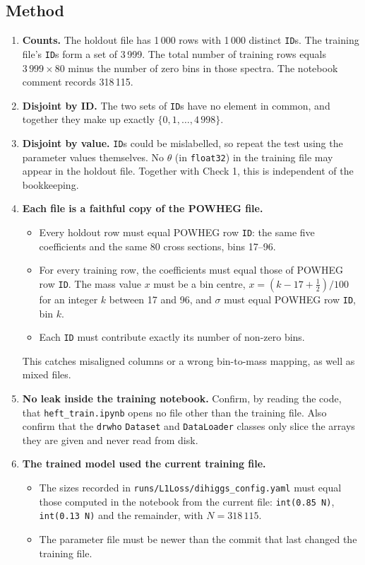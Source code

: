 \documentclass[11pt]{article}
\newcommand{\file}[1]{\nolinkurl{#1}}
\newcommand{\code}[1]{\texttt{#1}}
\begin{document}
\subsection{Method}
\begin{enumerate}[label=\textbf{2\alph*.}]
  \item \textbf{Counts.} The holdout file has 1\,000 rows with 1\,000 distinct
  \code{ID}s. The training file's \code{ID}s form a set of 3\,999. The total number
  of training rows equals $3\,999 \times 80$ minus the number of zero bins in those
  spectra. The notebook comment records 318\,115.
  \item \textbf{Disjoint by ID.} The two sets of \code{ID}s have no element in
  common, and together they make up exactly $\{0, 1, \dots, 4\,998\}$.
  \item \textbf{Disjoint by value.} \code{ID}s could be mislabelled, so repeat the
  test using the parameter values themselves. No $\theta$ (in \code{float32}) in
  the training file may appear in the holdout file. Together with Check 1, this is
  independent of the bookkeeping.
  \item \textbf{Each file is a faithful copy of the POWHEG file.}
  \begin{itemize}
    \item Every holdout row must equal POWHEG row \code{ID}: the same five
    coefficients and the same 80 cross sections, bins 17--96.
    \item For every training row, the coefficients must equal those of POWHEG row
    \code{ID}. The mass value $x$ must be a bin centre, $x = (k - 17 + \tfrac12)/100$
    for an integer $k$ between 17 and 96, and $\sigma$ must equal POWHEG row
    \code{ID}, bin $k$.
    \item Each \code{ID} must contribute exactly its number of non-zero bins.
  \end{itemize}
  This catches misaligned columns or a wrong bin-to-mass mapping, as well as mixed
  files.
  \item \textbf{No leak inside the training notebook.} Confirm, by reading the
  code, that \code{heft\_train.ipynb} opens no file other than the training file.
  Also confirm that the \code{drwho} \code{Dataset} and \code{DataLoader} classes
  only slice the arrays they are given and never read from disk.
  \item \textbf{The trained model used the current training file.}
  \begin{itemize}
    \item The sizes recorded in \file{runs/L1Loss/dihiggs_config.yaml} must
    equal those computed in the notebook from the current file:
    \code{int(0.85 N)}, \code{int(0.13 N)} and the remainder, with
    $N = 318\,115$.
    \item The parameter file must be newer than the commit that last changed the
    training file.
  \end{itemize}
\end{enumerate}
\end{document}
